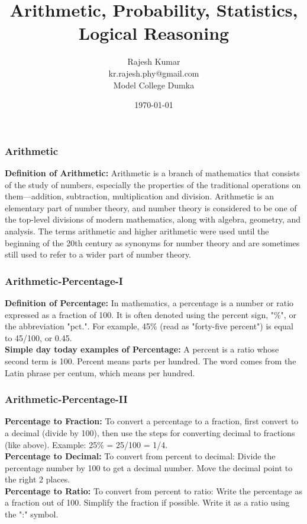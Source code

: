 \documentclass{beamer}
\title{Arithmetic, Probability, Statistics, Logical Reasoning}
\author{Rajesh Kumar\\kr.rajesh.phy@gmail.com\\Model College Dumka}
\date{\today}
\begin{document}
\frame{\titlepage}

\begin{frame}
    \frametitle{Arithmetic}
    {\bf Definition of Arithmetic:} Arithmetic is a branch of mathematics that consists of the study of numbers, especially the properties of the traditional operations on them---addition, subtraction, multiplication and division. Arithmetic is an elementary part of number theory, and number theory is considered to be one of the top-level divisions of modern mathematics, along with algebra, geometry, and analysis. The terms arithmetic and higher arithmetic were used until the beginning of the 20th century as synonyms for number theory and are sometimes still used to refer to a wider part of number theory.\\ 
\end{frame}

\begin{frame}
    \frametitle{Arithmetic-Percentage-I}
    {\bf Definition of Percentage:} In mathematics, a percentage is a number or ratio expressed as a fraction of 100. It is often denoted using the percent sign, "\%", or the abbreviation "pct.". For example, 45\% (read as "forty-five percent") is equal to 45/100, or 0.45.\\
    {\bf Simple day today examples of Percentage:} A percent is a ratio whose second term is 100. Percent means parts per hundred. The word comes from the Latin phrase per centum, which means per hundred.\\
\end{frame}

\begin{frame}
    \frametitle{Arithmetic-Percentage-II}
    {\bf Percentage to Fraction:} To convert a percentage to a fraction, first convert to a decimal (divide by 100), then use the steps for converting decimal to fractions (like above). Example: 25\% = 25/100 = 1/4.\\
    {\bf Percentage to Decimal:} To convert from percent to decimal: Divide the percentage number by 100 to get a decimal number. Move the decimal point to the right 2 places.\\
    {\bf Percentage to Ratio:} To convert from percent to ratio: Write the percentage as a fraction out of 100. Simplify the fraction if possible. Write it as a ratio using the ":" symbol.\\
\end{frame}
\end{document}
